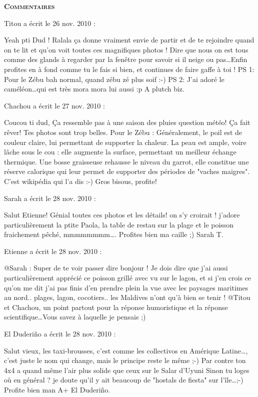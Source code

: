 \bigskip
\textbf{\textsc{Commentaires}}

\medskip
Titou a écrit le 26 nov. 2010 :
\begin{displayquote}
Yeah pti Dud !
Ralala ça donne vraiment envie de partir et de te rejoindre quand on te lit et qu'on voit toutes ces magnifiques photos !
Dire que nous on est tous comme des glands à regarder par la fenêtre pour savoir si il neige ou pas\dots Enfin profites en à fond comme tu le fais si bien, et continues de faire gaffe à toi !
PS 1: Pour le Zébu bah normal, quand zébu zé plus soif :-)
PS 2: J'ai adoré le caméléon\dots qui est très mora mora lui aussi :p
A plutch
biz.
\end{displayquote}

\medskip
Chachou a écrit le 27 nov. 2010 :
\begin{displayquote}
Coucou ti dud,
Ça ressemble pas à une saison des pluies question météo! Ça fait rêver! Tes photos sont trop belles.
Pour le Zébu : Généralement, le poil est de couleur claire, lui permettant de supporter la chaleur. La peau est ample, voire lâche sous le cou : elle augmente la surface, permettant un meilleur échange thermique.
Une bosse graisseuse rehausse le niveau du garrot, elle constitue une réserve calorique qui leur permet de supporter des périodes de "vaches maigres". C'est wikipédia qui l'a dis :-)
Gros bisous, profite!
\end{displayquote}

\medskip
Sarah a écrit le 28 nov. 2010 :
\begin{displayquote}
Salut Etienne!
Génial toutes ces photos et les détails!
on s'y croirait !
j'adore particulièrement la ptite Paola, la table de restau sur la plage et le poisson fraichement pêché, mmmmmmmm\dots.
Profites bien ma caille ;)
Sarah T.
\end{displayquote}

\medskip
Etienne a écrit le 28 nov. 2010 :
\begin{displayquote}
@Sarah : Super de te voir passer dire bonjour ! Je dois dire que j'ai aussi particulièrement apprécié ce poisson grillé avec vu sur le lagon, et si j'en crois ce qu'on me dit j'ai pas finis d'en prendre plein la vue avec les paysages maritimes au nord.. plages, lagon, cocotiers.. les Maldives n'ont qu'à bien se tenir !
@Titou et Chachou, un point partout pour la réponse humoristique et la réponse scientifique\dots Vous savez à laquelle je pensais ;)
\end{displayquote}

\medskip
El Duderiño a écrit le 28 nov. 2010 :
\begin{displayquote}
Salut vieux,
les taxi-brousses, c'est comme les collectivos en Amérique Latine\dots, c'est juste le nom qui change, mais le principe reste le même ;-)
Par contre ton 4x4 a quand même l'air plus solide que ceux sur le Salar d'Uyuni
Sinon tu loges où en général ? je doute qu'il y ait beaucoup de "hostals de fiesta" sur l'île\dots ;-)
Profite bien man
A+
El Duderiño.
\end{displayquote}


